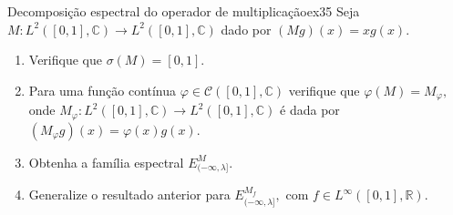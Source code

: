 \begin{exercício}{Decomposição espectral do operador de multiplicação}{ex35}
  Seja \(M : L^2([0,1],\mathbb{C}) \to L^2([0,1],\mathbb{C})\) dado por \((Mg)(x) = xg(x).\)
  \begin{enumerate}[label=(\alph*)]
    \item Verifique que \(\sigma(M) = [0,1]\).
    \item Para uma função contínua \(\varphi \in \mathcal{C}([0,1],\mathbb{C})\) verifique que \(\varphi(M) = M_{\varphi},\) onde \(M_{\varphi} : L^2([0,1], \mathbb{C}) \to L^2([0,1], \mathbb{C})\) é dada por \((M_\varphi g)(x) = \varphi(x)g(x).\)
    \item Obtenha a família espectral \(E^M_{(-\infty, \lambda]}\).
    \item Generalize o resultado anterior para \(E^{M_f}_{(-\infty, \lambda]},\) com \(f \in L^\infty([0,1],\mathbb{R}).\)
  \end{enumerate}
\end{exercício}
